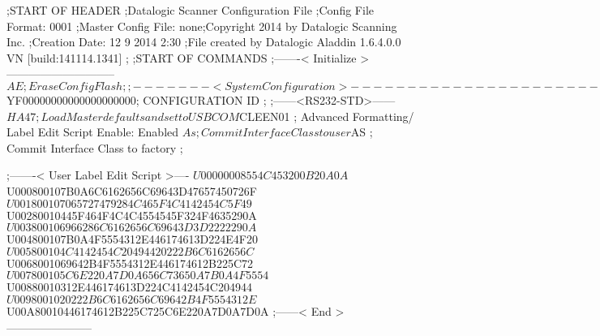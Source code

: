 ;START OF HEADER
;Datalogic Scanner Configuration File
;Config File Format: 0001
;Master Config File: none;Copyright 2014 by Datalogic Scanning Inc.
;Creation Date: 12 9 2014 2:30
;File created by Datalogic Aladdin 1.6.4.0.0 VN [build:141114.1341]
;
;START OF COMMANDS
;-------< Initialize >-----------------------------
$AE                 ; Erase Config Flash
;
;-------< System Configuration >-------------------------------
$YF00000000000000000000; CONFIGURATION ID
;
;------<RS232-STD>------
$HA47               ; Load Master defaults and set to USBCOM
$CLEEN01            ; Advanced Formatting/ Label Edit Script Enable: Enabled
$As                 ; Commit Interface Class to user
$AS                 ; Commit Interface Class to factory
;

;-------< User Label Edit Script >----
$U00000008554C453200B20A0A
$U000800107B0A6C6162656C69643D47657450726F
$U001800107065727479284C465F4C4142454C5F49
$U00280010445F464F4C4C4554545F324F4635290A
$U003800106966286C6162656C69643D3D2222290A
$U004800107B0A4F5554312E446174613D224E4F20
$U005800104C4142454C20494420222B6C6162656C
$U0068001069642B4F5554312E446174612B225C72
$U007800105C6E220A7D0A656C73650A7B0A4F5554
$U00880010312E446174613D224C4142454C204944
$U0098001020222B6C6162656C69642B4F5554312E
$U00A80010446174612B225C725C6E220A7D0A7D0A
;------< End >-----------------------
